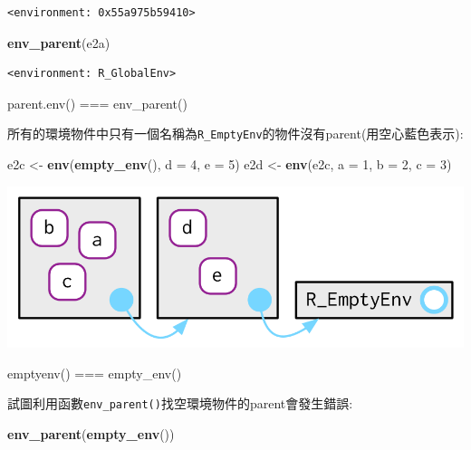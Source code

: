 \documentclass[]{book}
\newenvironment{Shaded}{\begin{snugshade}}{\end{snugshade}}
\newcommand{\DataTypeTok}[1]{\textcolor[rgb]{0.13,0.29,0.53}{#1}}
\newcommand{\DecValTok}[1]{\textcolor[rgb]{0.00,0.00,0.81}{#1}}
\newcommand{\KeywordTok}[1]{\textcolor[rgb]{0.13,0.29,0.53}{\textbf{#1}}}
\newcommand{\NormalTok}[1]{#1}
\newcommand{\StringTok}[1]{\textcolor[rgb]{0.31,0.60,0.02}{#1}}
\theoremstyle{definition}
\theoremstyle{definition}
\theoremstyle{definition}
\theoremstyle{remark}
\begin{document}
\begin{verbatim}
<environment: 0x55a975b59410>
\end{verbatim}

\begin{Shaded}
\begin{Highlighting}[]
\KeywordTok{env_parent}\NormalTok{(e2a)}
\end{Highlighting}
\end{Shaded}

\begin{verbatim}
<environment: R_GlobalEnv>
\end{verbatim}

parent.env() === env\_parent()

所有的環境物件中只有一個名稱為\texttt{R\_EmptyEnv}的物件沒有parent(用空心藍色表示):

\begin{Shaded}
\begin{Highlighting}[]
\NormalTok{e2c <-}\StringTok{ }\KeywordTok{env}\NormalTok{(}\KeywordTok{empty_env}\NormalTok{(), }\DataTypeTok{d =} \DecValTok{4}\NormalTok{, }\DataTypeTok{e =} \DecValTok{5}\NormalTok{)}
\NormalTok{e2d <-}\StringTok{ }\KeywordTok{env}\NormalTok{(e2c, }\DataTypeTok{a =} \DecValTok{1}\NormalTok{, }\DataTypeTok{b =} \DecValTok{2}\NormalTok{, }\DataTypeTok{c =} \DecValTok{3}\NormalTok{)}
\end{Highlighting}
\end{Shaded}

\begin{center}\includegraphics{diagrams/environments/parents-empty} \end{center}

emptyenv() === empty\_env()

試圖利用函數\texttt{env\_parent()}找空環境物件的parent會發生錯誤:

\begin{Shaded}
\begin{Highlighting}[]
\KeywordTok{env_parent}\NormalTok{(}\KeywordTok{empty_env}\NormalTok{())}
\end{Highlighting}
\end{Shaded}
\end{document}
